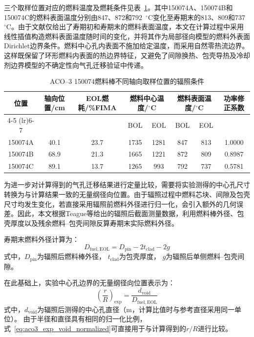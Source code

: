 三个取样位置对应的燃料温度及燃耗条件见表~\ref{tab:aco3_sample_conditions}。其中150074A、150074B和150074C的燃料表面温度分别由847、872和792~${}^{\circ}$C变化至寿期末的813、809和737~${}^{\circ}$C。由于文献仅给出了寿期初和寿期末的燃料表面温度，本文在计算过程中采用线性插值构造燃料表面温度随时间的变化，并将其作为局部径向模型的燃料外表面Dirichlet边界条件。燃料中心孔内表面不施加给定温度，而采用自然零热流边界。这样既保留了环形燃料内表面的热边界特征，又避免了间隙换热、包壳导热及冷却剂边界模型的不确定性向气孔迁移验证中传递。

\begin{table}[htbp]
	\centering
	\caption{ACO--3 150074燃料棒不同轴向取样位置的辐照条件}
	\label{tab:aco3_sample_conditions}
	\setlength{\tabcolsep}{4pt}
\begin{tabular}{cccccccc}
		\toprule
		位置 &
		轴向位置/cm &
		EOL燃耗/\%FIMA &
		\multicolumn{2}{c}{燃料中心温度/${}^{\circ}$C} &
		\multicolumn{2}{c}{燃料表面温度/${}^{\circ}$C} &
		功率修正系数 \\
		\cmidrule(lr){4-5}
		\cmidrule(lr){6-7}
		& & & BOL & EOL & BOL & EOL & \\
		\midrule
		150074A & 40.1 & 23.7 & 1735 & 1281 & 847 & 813 & 1.0000 \\
		150074B & 68.9 & 21.3 & 1665 & 1221 & 872 & 809 & 0.8987 \\
		150074C & 89.1 & 13.7 & 1265 &  993 & 792 & 737 & 0.5781 \\
		\bottomrule
	\end{tabular}
\end{table}

为进一步对计算得到的气孔迁移结果进行定量比较，需要将实验测得的中心孔尺寸转换为与计算结果一致的无量纲径向位置。由于辐照过程中燃料芯块、间隙及包壳尺寸均发生变化，若直接采用辐照前燃料外径进行归一化，会引入额外的几何误差。因此，本文根据Teague等\cite{teagueMicrostructuralCharacterizationHigh2013}给出的辐照后截面测量数据，利用燃料棒外径、包壳厚度以及残余燃料--包壳间隙反算寿期末实际燃料外径。

寿期末燃料外径计算为：
\begin{equation}
	D_{\mathrm{fuel,EOL}}
	=
	D_{\mathrm{pin}}
	-2t_{\mathrm{clad}}
	-2g 
	\label{eq:aco3_eol_fuel_diameter}
\end{equation}
\noindent 式中，$D_{\mathrm{pin}}$为辐照后燃料棒外径，
$t_{\mathrm{clad}}$为包壳厚度，
$g$为辐照后单侧燃料--包壳间隙。

在此基础上，实验中心孔边界的无量纲径向位置表示为：
\begin{equation}
	\left(\frac{r}{R}\right)_{\mathrm{exp}}
	=
	\frac{d_{\mathrm{void}}}
	{D_{\mathrm{fuel,EOL}}}
	\label{eq:aco3_exp_void_normalized}
\end{equation}
\noindent 式中，$d_{\mathrm{void}}$为辐照后测得的中心孔直径（$\mathrm{m}$，计算比值时与参考直径采用同一单位）。
由于半径和直径具有相同的归一化比例，式~\eqref{eq:aco3_exp_void_normalized}可直接用于与计算得到的$r/R$进行比较。

